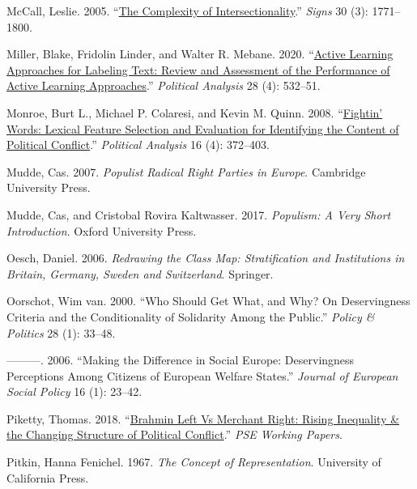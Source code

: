\documentclass[12pt]{article}
\newlength{\cslhangindent}
\newenvironment{CSLReferences}[2]
  {\begin{list}{}{%
    \setlength{\itemindent}{0pt}
    \setlength{\leftmargin}{0pt}
    \setlength{\parsep}{0pt}
    \ifodd #1
      \setlength{\leftmargin}{\cslhangindent}
      \setlength{\itemindent}{-\cslhangindent}
    \fi
    \setlength{\itemsep}{#2\baselineskip}}}
  {\end{list}}
\begin{document}
\begin{CSLReferences}{1}{0}
McCall, Leslie. 2005. {``\href{https://doi.org/10.1086/426800}{The Complexity of Intersectionality}.''} \emph{Signs} 30 (3): 1771--1800.

Miller, Blake, Fridolin Linder, and Walter R. Mebane. 2020. {``\href{https://doi.org/10.1017/pan.2020.4}{Active Learning Approaches for Labeling Text: Review and Assessment of the Performance of Active Learning Approaches}.''} \emph{Political Analysis} 28 (4): 532--51.

Monroe, Burt L., Michael P. Colaresi, and Kevin M. Quinn. 2008. {``\href{https://doi.org/10.1093/pan/mpn018}{Fightin' Words: Lexical Feature Selection and Evaluation for Identifying the Content of Political Conflict}.''} \emph{Political Analysis} 16 (4): 372--403.

Mudde, Cas. 2007. \emph{Populist Radical Right Parties in Europe}. Cambridge University Press.

Mudde, Cas, and Cristobal Rovira Kaltwasser. 2017. \emph{Populism: A Very Short Introduction}. Oxford University Press.

Oesch, Daniel. 2006. \emph{Redrawing the Class Map: Stratification and Institutions in Britain, Germany, Sweden and Switzerland}. Springer.

Oorschot, Wim van. 2000. {``Who Should Get What, and Why? On Deservingness Criteria and the Conditionality of Solidarity Among the Public.''} \emph{Policy \& Politics} 28 (1): 33--48.

---------. 2006. {``Making the Difference in Social Europe: Deservingness Perceptions Among Citizens of European Welfare States.''} \emph{Journal of European Social Policy} 16 (1): 23--42.

Piketty, Thomas. 2018. {``\href{https://ideas.repec.org//p/hal/psewpa/hal-02878211.html}{Brahmin Left Vs Merchant Right: Rising Inequality \& the Changing Structure of Political Conflict}.''} \emph{{PSE} Working Papers}.

Pitkin, Hanna Fenichel. 1967. \emph{The Concept of Representation}. University of California Press.


\end{CSLReferences}
\end{document}
